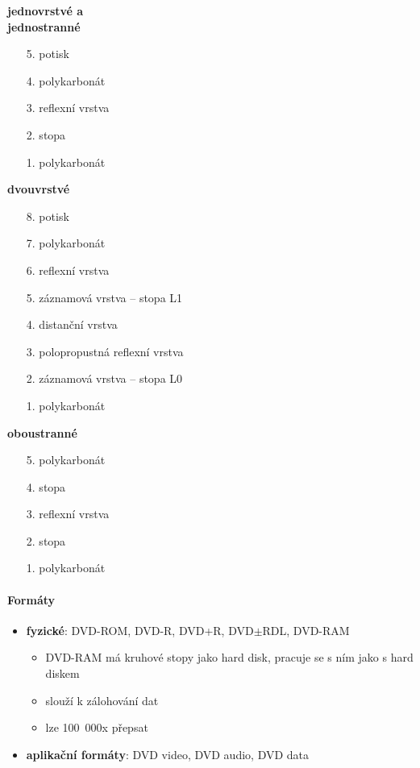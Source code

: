\documentclass[a4paper,12pt]{article}
\providecommand{\tightlist}{%
\setlength{\itemsep}{0pt}\setlength{\parskip}{0pt}}
\begin{document}
\begin{minipage}[t]{0.3\textwidth}
  \textbf{jednovrstvé a \\jednostranné}
  \begin{itemize}
    \tightlist
    \item[5.] potisk
    \item[4.] polykarbonát
    \item[3.] reflexní vrstva
    \item[2.] stopa
    \item[1.] polykarbonát
  \end{itemize}
\end{minipage}%
\begin{minipage}[t]{0.4\textwidth}
  \textbf{dvouvrstvé}
  \begin{itemize}
    \tightlist
    \item[8.] potisk
    \item[7.] polykarbonát
    \item[6.] reflexní vrstva
    \item[5.] záznamová vrstva -- stopa L1
    \item[4.] distanční vrstva
    \item[3.] polopropustná reflexní vrstva
    \item[2.] záznamová vrstva -- stopa L0
    \item[1.] polykarbonát
  \end{itemize}
\end{minipage}%
\begin{minipage}[t]{0.3\textwidth}
  \textbf{oboustranné}
  \begin{itemize}
    \tightlist
    \item[5.] polykarbonát
    \item[4.] stopa
    \item[3.] reflexní vrstva
    \item[2.] stopa
    \item[1.] polykarbonát
  \end{itemize}
\end{minipage}

\vspace{5mm}

\paragraph{Formáty}

\begin{itemize}
  \tightlist
  \item \textbf{fyzické}: DVD-ROM, DVD-R, DVD+R, DVD$\pm$RDL, DVD-RAM
  \begin{itemize}
    \tightlist
    \item DVD-RAM má kruhové stopy jako hard disk, pracuje se s ním jako s hard
    diskem
    \item slouží k zálohování dat
    \item lze 100~000x přepsat
  \end{itemize}
  \item \textbf{aplikační formáty}: DVD video, DVD audio, DVD data
\end{itemize}
\end{document}
